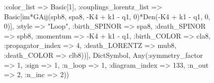 \documentclass{revtex4}
\begin{document}
\begin{figure}[!htb]
\begin{center}
{:color_list => Basic[1], :couplings_lorentz_list => Basic[im*GAij(spb8, spa8, -K4 + k1 - q1, 0)*Den(-K4 + k1 - q1, 0, 0)], :style => "Loop", :birth_SPINOR => spa8, :death_SPINOR => spb8, :momentum => -K4 + k1 - q1, :birth_COLOR => cla8, :propagator_index => 4, :death_LORENTZ => mub8, :death_COLOR => clb8))], Dict{Symbol, Any}(:symmetry_factor => 1, :sign => 1, :n_loop => 1, :diagram_index => 133, :n_out => 2, :n_inc => 2)) 
}
\end{center}
\end{figure}
\end{document}
